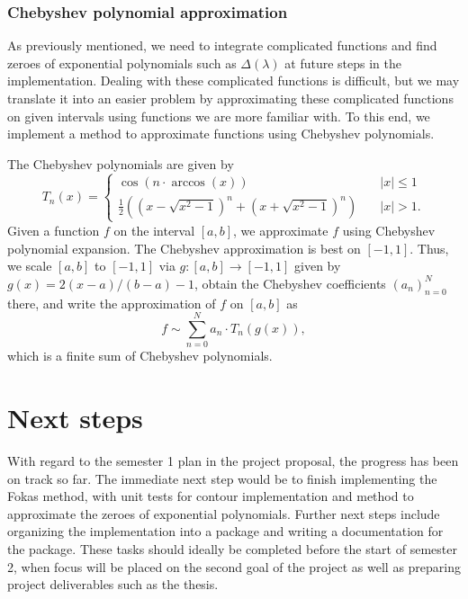 \documentclass[11pt, oneside, a4paper]{article}
\begin{document}
\subsubsection{Chebyshev polynomial approximation}
As previously mentioned, we need to integrate complicated functions and find zeroes of exponential polynomials such as $\Delta(\lambda)$ at future steps in the implementation. Dealing with these complicated functions is difficult, but we may translate it into an easier problem by approximating these complicated functions on given intervals using functions we are more familiar with. To this end, we implement a method to approximate functions using Chebyshev polynomials.

The Chebyshev polynomials are given by
\[
    T_n(x) =
\begin{cases}
    \cos(n\cdot \arccos(x))&\quad\mbox{$|x|\leq 1$}\\
    \frac{1}{2}\left((x-\sqrt{x^2-1})^n + (x+\sqrt{x^2-1})^n\right)&\quad\mbox{$|x|>1$}.
\end{cases}    
\]
Given a function $f$ on the interval $[a,b]$, we approximate $f$ using Chebyshev polynomial expansion. The Chebyshev approximation is best on $[-1,1]$. Thus, we scale $[a,b]$ to $[-1,1]$ via $g:[a,b]\to [-1,1]$ given by $g(x)=2(x-a)/(b-a)-1$, obtain the Chebyshev coefficients $(a_n)_{n=0}^N$ there, and write the approximation of $f$ on $[a,b]$ as
\[f\sim \sum_{n=0}^N a_n\cdot T_n(g(x)),\]
which is a finite sum of Chebyshev polynomials.

\section{Next steps}
With regard to the semester 1 plan in the project proposal, the progress has been on track so far. The immediate next step would be to finish implementing the Fokas method, with unit tests for contour implementation and method to approximate the zeroes of exponential polynomials. Further next steps include organizing the implementation into a package and writing a documentation for the package. These tasks should ideally be completed before the start of semester 2, when focus will be placed on the second goal of the project as well as preparing project deliverables such as the thesis.

\newpage

% 

\end{document}
